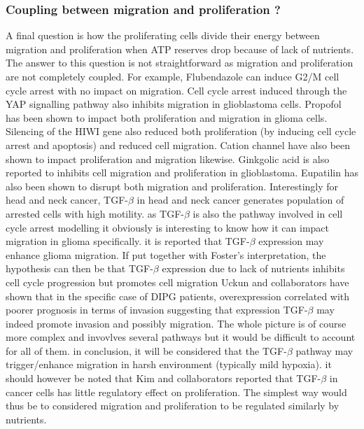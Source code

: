 \documentclass[11pt,a4paper]{article}
\begin{document}
\subsubsection{Coupling between migration and proliferation ?}
A final question is how the proliferating cells divide their energy between migration and proliferation when ATP reserves drop because of lack of nutrients. The answer to this question is not straightforward as migration and proliferation are not completely coupled. For example, Flubendazole can induce G2/M cell cycle arrest with no impact on migration\cite{Zhou2018}. Cell cycle arrest induced through the YAP signalling pathway also inhibits migration in glioblastoma cells.\cite{Wang2023} Propofol has been shown to impact both proliferation and migration in glioma cells.\cite{Cheng2022} Silencing of the HIWI gene also reduced both proliferation (by inducing cell cycle arrest and apoptosis) and reduced cell migration.\cite{WangX2014} Cation channel have also been shown to impact proliferation and migration likewise.\cite{Rooj2011} Ginkgolic acid is also reported to inhibits cell migration and proliferation in glioblastoma.\cite{Li2021} Eupatilin has also been shown to disrupt both migration and proliferation.\cite{Fei2019} Interestingly for head and neck cancer, TGF-$\beta$ in head and neck cancer generates population of arrested cells  with high motility.\cite{Takahashi2022} as TGF-$\beta$ is also the pathway involved in cell cycle arrest modelling it obviously is interesting to know how it can impact migration in glioma specifically. it is reported that TGF-$\beta$ expression may enhance glioma migration.\cite{Han2015} If put together with Foster's interpretation, the hypothesis can then be that TGF-$\beta$ expression due to lack of nutrients inhibits cell cycle progression but promotes cell migration\cite{Foster2010} Uckun and collaborators have shown that in the specific case of DIPG patients, overexpression correlated with poorer prognosis in terms of invasion suggesting that expression TGF-$\beta$ may indeed promote invasion and possibly migration.\cite{Uckun2023} The whole picture is of course more complex and invovlves several pathways but it would be difficult to account for all of them. in conclusion, it will be considered that the TGF-$\beta$ pathway may trigger/enhance migration in harsh environment (typically mild hypoxia). it should however be noted that Kim and collaborators reported that TGF-$\beta$ in cancer cells has little regulatory effect on proliferation. The simplest way would thus be to considered migration and proliferation to be regulated similarly by nutrients.
\end{document}
